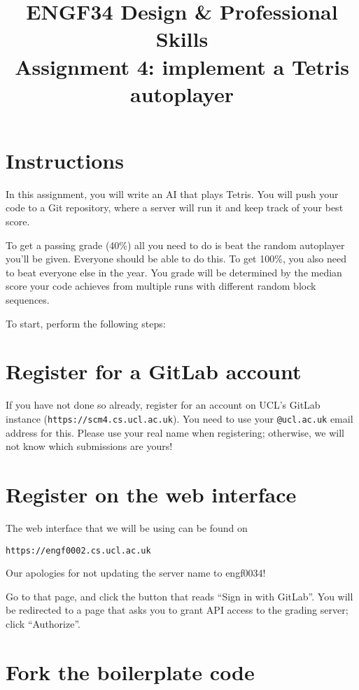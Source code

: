 \documentclass{article}
\title{ENGF34 Design \& Professional Skills\\
  Assignment 4: implement a Tetris autoplayer}
\author{}
\date{}
\begin{document}
\maketitle

\section*{Instructions}

In this assignment, you will write an AI that plays Tetris. You will
push your code to a Git repository, where a server will run it and
keep track of your best score.

To get a passing grade (40\%) all you need to do is beat the random
autoplayer you’ll be given. Everyone should be able to do this. To get
100\%, you also need to beat everyone else in the year. You grade will
be determined by the median score your code achieves from multiple
runs with different random block sequences.

To start, perform the following steps:
\section{Register for a GitLab account}
  
If you have not done so already, register for an account on UCL's
GitLab instance (\texttt{https://scm4.cs.ucl.ac.uk}). You need to use your
\texttt{@ucl.ac.uk} email address for this. Please use your real name when
registering; otherwise, we will not know which submissions are yours!

\section{Register on the web interface}

The web interface that we will be using can be found on
\begin{verbatim}
https://engf0002.cs.ucl.ac.uk
\end{verbatim}

Our apologies for not updating the server name to engf0034!

Go to that page, and click the button
that reads “Sign in with GitLab”. You will be redirected to a page
that asks you to grant API access to the grading server; click
“Authorize”.

\section{Fork the boilerplate code}
\end{document}
